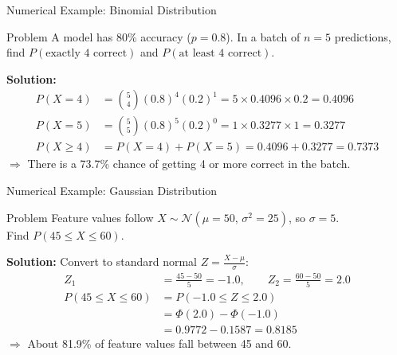 \begin{frame}{Numerical Example: Binomial Distribution}
\begin{exampleblock}{Problem}
A model has 80\% accuracy ($p=0.8$). In a batch of $n=5$ predictions,\\
find $P(\text{exactly 4 correct})$ and $P(\text{at least 4 correct})$.
\end{exampleblock}
\textbf{Solution:}
\begin{align*}
P(X=4) &= \binom{5}{4}(0.8)^4(0.2)^1 = 5 \times 0.4096 \times 0.2 = \mathbf{0.4096}\\[6pt]
P(X=5) &= \binom{5}{5}(0.8)^5(0.2)^0 = 1 \times 0.3277 \times 1 = \mathbf{0.3277}\\[6pt]
P(X \geq 4) &= P(X=4) + P(X=5) = 0.4096 + 0.3277 = \mathbf{0.7373}
\end{align*}
$\Rightarrow$ There is a 73.7\% chance of getting 4 or more correct in the batch.
\end{frame}

\begin{frame}{Numerical Example: Gaussian Distribution}
\begin{exampleblock}{Problem}
Feature values follow $X \sim \mathcal{N}(\mu=50,\, \sigma^2=25)$, so $\sigma=5$.\\
Find $P(45 \leq X \leq 60)$.
\end{exampleblock}
\textbf{Solution:} Convert to standard normal $Z = \frac{X-\mu}{\sigma}$:
\begin{align*}
Z_1 &= \frac{45-50}{5} = -1.0, \qquad Z_2 = \frac{60-50}{5} = 2.0\\[6pt]
P(45 \leq X \leq 60) &= P(-1.0 \leq Z \leq 2.0)\\
                       &= \Phi(2.0) - \Phi(-1.0)\\
                       &= 0.9772 - 0.1587 = \mathbf{0.8185}
\end{align*}
$\Rightarrow$ About 81.9\% of feature values fall between 45 and 60.
\end{frame}
